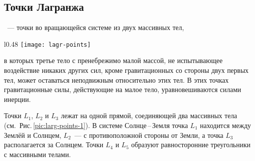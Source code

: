 \subsection{Точки Лагранжа}

~--- точки во вращающейся системе из двух массивных тел,
\begin{wrapfigure}[14]{l}{0.48\tw}
	\centering
	\vspace{-.5pc}
	\texttt{[image: lagr-points]}
	\label{pic:larg-points-1}	
\end{wrapfigure}
в которых третье тело с пренебрежимо 
малой массой, не испытывающее воздействие никаких 
других сил, кроме гравитационных со стороны двух 
первых тел, может оставаться неподвижным относительно 
этих тел. В этих точках гравитационные силы, 
действующие на малое тело, уравновешиваются силами инерции.

Точки $L_1$, $L_2$ и $L_3$ лежат на одной прямой, 
соединяющей два массивных тела (см.~Рис.\,\ref{pic:larg-points-1}). 
В системе Солнце\,--\,Земля точка $L_1$ находится между Землёй и 
Солнцем, $L_2$~--- с противоположной стороны от Земли, а точка 
$L_3$ располагается за Солнцем. Точки $L_4$ и $L_5$ 
образуют равносторонние треугольники с массивными телами.

%



